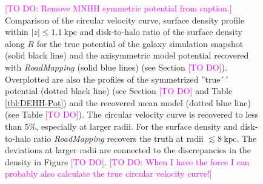 \documentclass[iop,revtex4,numberedappendix,appendixfloats]{emulateapj}
\newcommand{\RM}{{\sl RoadMapping}}
\newcommand{\Wilma}[1]{\textcolor{Magenta}{#1}}
\begin{document}
\begin{figure}[!htbp]
\caption{\Wilma{[TO DO: Remove MNHH symmetric potential from caption.]} Comparison of the circular velocity curve, surface density profile within $|z|\leq1.1~\text{kpc}$ and disk-to-halo ratio of the surface density along $R$ for the true potential of the galaxy simulation snapshot (solid black line) and the axisymmetric model potential recovered with \RM{} (solid blue lines) (see Section \Wilma{[TO DO]}). Overplotted are also the profiles of the symmetrized ''true´´ potential (dotted black line) (see Section \Wilma{[TO DO]} and Table \ref{tbl:DEHH-Pot}) and the recovered mean model (dotted blue line) (see Table \Wilma{[TO DO]}). The circular velocity curve is recovered to less than $5\%$, especially at larger radii. For the surface density and disk-to-halo ratio \RM{} recovers the truth at radii $\lesssim 8~\text{kpc}$. The deviations at larger radii are connected to the discrepancies in the density in Figure \Wilma{[TO DO]}. \Wilma{[TO DO: When I have the force I can probably also calculate the true circular velocity curve!]}}
\label{fig:???}
\end{figure}
\end{document}
